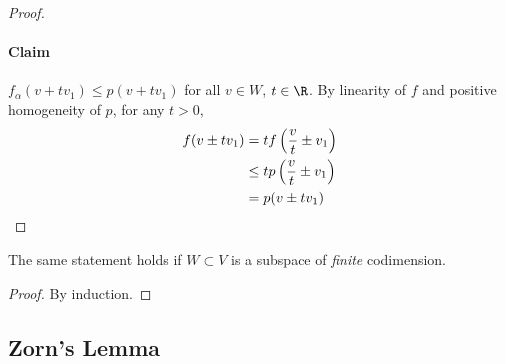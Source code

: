 \documentclass{article}
\begin{document}
\begin{proof}
    \paragraph{Claim} $f_\alpha(v + t v_1) \leq p(v + t v_1)$ for all $v \in W$, $t \in \R$.
    By linearity of $f$ and positive homogeneity of $p$, for any $t > 0$,
    \begin{align*}
        f(v \pm t v_1) &= t f\left(\frac vt \pm v_1\right) \\
                       &\leq t p\left(\frac vt \pm v_1\right) \\
                       &= p(v \pm t v_1)\qedhere
    \end{align*}
\end{proof}

\begin{cor}
    The same statement holds if $W \subset V$ is a subspace of \emph{finite} codimension.
\end{cor}

\begin{proof}
    By induction.
\end{proof}

\subsection{Zorn's Lemma}
\end{document}
